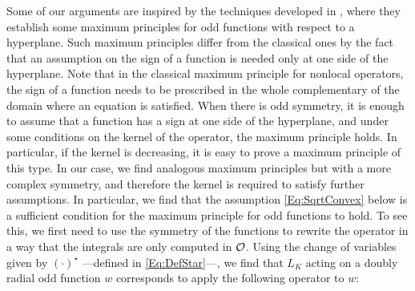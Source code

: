 Some of our arguments are inspired by the techniques developed in \cite{ChenLiLi, JarohsWeth}, where they establish some maximum principles for odd functions with respect to a hyperplane. Such maximum principles differ from the classical ones by the fact that an assumption on the sign of a function is needed only at one side of the hyperplane. Note that in the classical maximum principle for nonlocal operators, the sign of a function needs to be prescribed in the whole complementary of the domain where an equation is satisfied. When there is odd symmetry, it is enough to assume that a function has a sign at one side of the hyperplane, and under some conditions on the kernel of the operator, the maximum principle holds. In particular, if the kernel is decreasing, it is easy to prove a maximum principle of this type. In our case, we find analogous maximum principles but with a more complex symmetry, and therefore the kernel is required to satisfy further assumptions. In particular, we find that the assumption \eqref{Eq:SqrtConvex} below is a sufficient condition for the maximum principle for odd functions to hold. To see this, we  first need to use the symmetry of the functions to rewrite the operator in a way that the integrals are only computed in $\mathcal{O}$. Using the change of variables given by $(\cdot)^\star$ ---defined in \eqref{Eq:DefStar}---, we find that $L_K$ acting on a doubly radial odd function $w$ corresponds to apply the following operator to $w$: 



